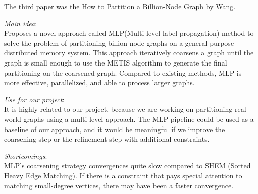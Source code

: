 The third paper was the How to Partition a Billion-Node Graph by Wang.
\cite{Billion_Node_Graph}
\begin{itemize*}
\item {\em Main idea}: \\
Proposes a novel approach called MLP(Multi-level label propagation) method to solve the problem of partitioning billion-node graphs on a general purpose distributed memory system. This approach iteratively coarsens a graph until the graph is small enough to use the METIS\cite{Metis} algorithm to generate the final partitioning on the coarsened graph. Compared to existing methods, MLP is more effective, parallelized, and able to process larger graphs. 
\item {\em Use for our project}: \\
It is highly related to our project, because we are working on partitioning real world graphs using a multi-level approach. The MLP pipeline could be used as a baseline of our approach, and it would be meaningful if we improve the coarsening step or the refinement step with additional constraints. 
\item {\em Shortcomings}:\\
MLP's coarsening strategy convergences quite slow compared to SHEM (Sorted Heavy Edge Matching). If there is a constraint that pays special attention to matching small-degree vertices, there may have been a faster convergence.  
\end{itemize*}


